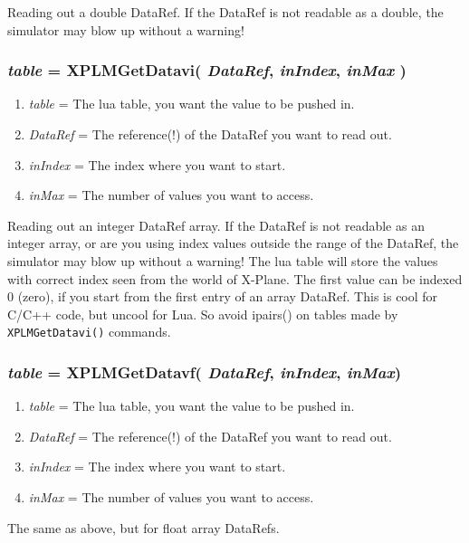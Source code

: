 \documentclass[11pt,parskip=half,a4paper]{scrartcl}
\begin{document}
Reading out a double DataRef. If the DataRef is not readable as a double, the simulator may blow up without a warning!

\subsubsection{\emph{table} = XPLMGetDatavi( \emph{DataRef}, \emph{inIndex}, \emph{inMax} )}

\begin{enumerate}
	\item \emph{table} = The lua table, you want the value to be pushed in.
	\item \emph{DataRef} = The reference(!) of the DataRef you want to read out.
	\item \emph{inIndex} = The index where you want to start.
	\item \emph{inMax} = The number of values you want to access.
\end{enumerate}

Reading out an integer DataRef array. If the DataRef is not readable as an integer array, or are you using index values outside the range of the DataRef, the simulator may blow up without a warning! The lua table will store the values with correct index seen from the world of X-Plane. The first value can be indexed 0 (zero), if you start from the first entry of an array DataRef. This is cool for C/C++ code, but uncool for Lua. So avoid ipairs() on tables made by \verb|XPLMGetDatavi()| commands.

\subsubsection{\emph{table} = XPLMGetDatavf( \emph{DataRef}, \emph{inIndex}, \emph{inMax})}

\begin{enumerate}
	\item \emph{table} = The lua table, you want the value to be pushed in.
	\item \emph{DataRef} = The reference(!) of the DataRef you want to read out.
	\item \emph{inIndex} = The index where you want to start.
	\item \emph{inMax} = The number of values you want to access.
\end{enumerate}

The same as above, but for float array DataRefs.

\vspace{4ex}
\end{document}
